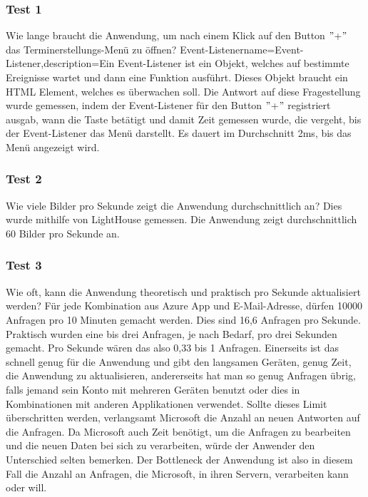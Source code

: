 \subsubsection{Test 1}\label{subsubsec:test-1}
\newline
\newline
Wie lange braucht die Anwendung, um nach einem Klick auf den Button \("\)+\("\) das Terminerstellungs-Menü zu öffnen?
\gls{Event-Listener}{name={Event-Listener},description={Ein Event-Listener ist ein Objekt, welches auf bestimmte Ereignisse wartet und dann eine Funktion ausführt. Dieses Objekt braucht ein HTML Element, welches es überwachen soll.}}
Die Antwort auf diese Fragestellung wurde gemessen, indem der Event-Listener für den Button \("\)+\("\) registriert ausgab, wann die Taste betätigt und damit Zeit gemessen wurde, die vergeht, bis der \gls{Event-Listener} das Menü darstellt.
Es dauert im Durchschnitt 2ms, bis das Menü angezeigt wird.
\newline
\newline
\subsubsection{Test 2}\label{subsubsec:test-2}
\newline
\newline
Wie viele Bilder pro Sekunde zeigt die Anwendung durchschnittlich an?
Dies wurde mithilfe von LightHouse gemessen.
Die Anwendung zeigt durchschnittlich 60 Bilder pro Sekunde an.
\newline
\newline
\subsubsection{Test 3}\label{subsubsec:test-3}
\newline
\newline
{}
Wie oft, kann die Anwendung theoretisch und praktisch pro Sekunde aktualisiert werden?
Für jede Kombination aus Azure App und E-Mail-Adresse, dürfen 10000 Anfragen pro 10 Minuten gemacht werden.
Dies sind 16,6 Anfragen pro Sekunde.
Praktisch wurden eine bis drei Anfragen, je nach Bedarf, pro drei Sekunden gemacht.
Pro Sekunde wären das also 0,33 bis 1 Anfragen.
Einerseits ist das schnell genug für die Anwendung und gibt den langsamen Geräten, genug Zeit, die Anwendung zu aktualisieren, andererseits hat man so genug Anfragen übrig, falls jemand sein Konto mit mehreren Geräten benutzt oder dies in Kombinationen mit anderen Applikationen verwendet.
Sollte dieses Limit überschritten werden, verlangsamt Microsoft die Anzahl an neuen Antworten auf die Anfragen.
Da Microsoft auch Zeit benötigt, um die Anfragen zu bearbeiten und die neuen Daten bei sich zu verarbeiten, würde der Anwender den Unterschied selten bemerken.
Der \gls{Bottleneck} der Anwendung ist also in diesem Fall die Anzahl an Anfragen, die Microsoft, in ihren Servern, verarbeiten kann oder will.
\newline
\newline
